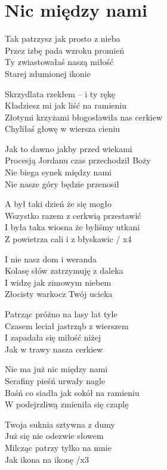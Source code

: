 \section{Nic między nami}
\begin{text}
    Tak patrzysz jak prosto z nieba\\
    Przez izbę pada wzroku promień\\
    Ty zwiastowałaś naszą miłość\\
    Starej zdumionej ikonie

    Skrzydlata rzekłem – i ty rękę\\
    Kładziesz mi jak liść na ramieniu\\
    Złotymi krzyżami błogosławiła nas cerkiew\\
    Chyliłaś głowę w wiersza cieniu

    \vin Jak to dawno jakby przed wiekami\\
    \vin Procesją Jordanu czas przechodził Boży\\
    \vin Nie biega synek między nami\\
    \vin Nie nasze góry będzie przenosił

    \vin A był taki dzień że się mogło\\
    \vin Wszystko razem z cerkwią przestawić\\
    \vin I była taka wiosna że byliśmy utkani\\
    \vin Z powietrza cali i z błyskawic / x4

    I nie nasz dom i weranda\\
    Kolasę słów zatrzymuję z daleka\\
    I widzę jak zimowym niebem\\
    Złocisty warkocz Twój ucieka

    Patrząc próżno na lasy lat tyle\\
    Czasem leciał jastrząb z wierszem\\
    I zapadała się miłość niżej\\
    Jak w trawy nasza cerkiew

    Nie ma już nic między nami\\
    Serafiny pieśń urwały nagle\\
    Baśń co siadła jak sokół na ramieniu\\
    W podejrzliwą zmieniła się czaplę

    Twoja suknia sztywna z dumy\\
    Już się nie odezwie słowem\\
    Milcząc patrzy tylko na mnie\\
    Jak ikona na ikonę /x3
\end{text}